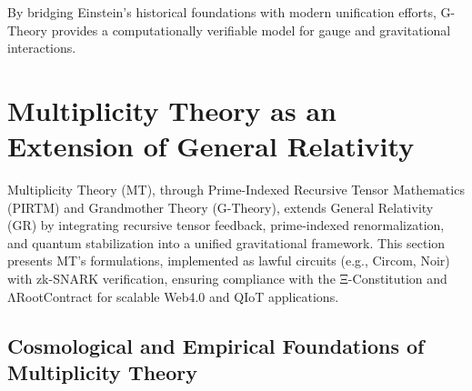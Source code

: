 \documentclass{article}
\theoremstyle{plain}
\begin{document}
By bridging Einstein’s historical foundations with modern unification efforts, G-Theory provides a computationally verifiable model for gauge and gravitational interactions.

\section{Multiplicity Theory as an Extension of General Relativity}

Multiplicity Theory (MT), through Prime-Indexed Recursive Tensor Mathematics (PIRTM) and Grandmother Theory (G-Theory), extends General Relativity (GR) by integrating recursive tensor feedback, prime-indexed renormalization, and quantum stabilization into a unified gravitational framework. This section presents MT's formulations, implemented as lawful circuits (e.g., Circom, Noir) with zk-SNARK verification, ensuring compliance with the Ξ-Constitution and ΛRootContract for scalable Web4.0 and QIoT applications.

\subsection{Cosmological and Empirical Foundations of Multiplicity Theory}

\end{document}
